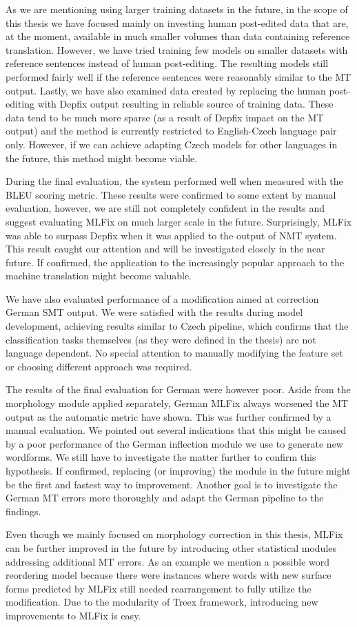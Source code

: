 As we are mentioning using larger training datasets in the future, in the scope of this thesis we have
focused mainly on investing human post-edited data that are, at the moment, available in much smaller
volumes than data containing reference translation. However, we have tried training few models on smaller
datasets with reference sentences instead of human post-editing. The resulting models still performed
fairly well if the reference sentences were reasonably similar to the MT output. Lastly, we have
also examined data created by replacing the human post-editing with Depfix output resulting in reliable
source of training data. These data tend to be much more sparse (as a result of Depfix
impact on the MT output) and the method is currently restricted to English-Czech language pair only.
However, if we can achieve adapting Czech models for other languages in the future, this method might
become viable.

During the final evaluation, the system performed well when measured with the BLEU scoring metric.
These results were confirmed to some extent by manual evaluation, however, we are still not
completely confident in the results and suggest evaluating MLFix on much larger scale in the future.
Surprisingly, MLFix was able to surpass Depfix when it was applied to the output of NMT system.
This result caught our attention and will be investigated closely in the near future. If confirmed,
the application to the increasingly popular approach to the machine translation might become valuable.

We have also evaluated performance of a modification aimed at correction German SMT output. We were
satisfied with the results during model development, achieving results similar to Czech pipeline,
which confirms that the classification tasks themselves (as they were defined in the thesis) are
not language dependent. No special attention to manually modifying the feature set or choosing
different approach was required.

The results of the final evaluation for German were however poor. Aside from the morphology module applied separately,
German MLFix always worsened the MT output as the automatic metric have shown. This was further confirmed
by a manual evaluation. We pointed out
several indications that this might be caused by a poor performance of the German inflection module
we use to generate new wordforms. We still have to investigate the matter further to confirm this hypothesis.
If confirmed, replacing (or improving) the module in the future might be the first and fastest
way to improvement.
Another goal is to investigate the German MT errors more thoroughly and adapt the German pipeline to the findings.

Even though we mainly focused on morphology correction in this thesis, MLFix can be further improved
in the future by introducing other statistical modules addressing additional MT errors. As an example
we mention a possible word reordering model because there were instances where words with new surface
forms predicted by MLFix still needed rearrangement to fully utilize the modification. Due to the modularity
of Treex framework, introducing new improvements to MLFix is easy.
